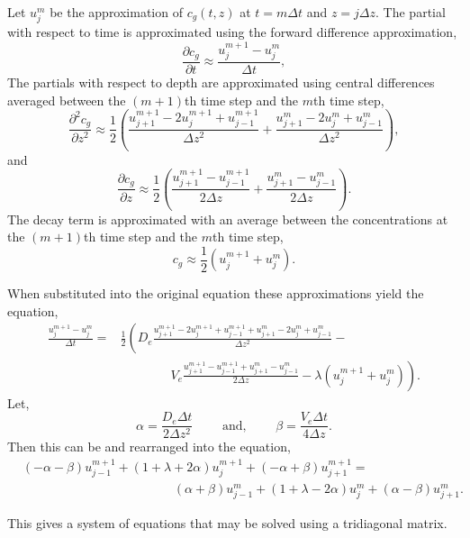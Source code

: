\documentclass[11pt, letterpaper]{article}
\begin{document}
Let $u^m_j$ be the approximation of $c_g(t, z)$ at $t = m \Delta t$ and $z = j \Delta z$.
The partial with respect to time is approximated using the forward difference approximation,
\[
    \frac{\partial c_g}{\partial t} \approx \frac{u^{m + 1}_j - u^m_j}{\Delta t},
\]
The partials with respect to depth are approximated using central differences averaged between the $(m + 1)$th time step and the $m$th time step,
\[
    \frac{\partial^2 c_g}{\partial z^2} \approx \frac{1}{2} \left(
        \frac{u^{m + 1}_{j + 1} - 2u^{m + 1}_j + u^{m + 1}_{j - 1}}{\Delta z^2} +
    \frac{u^{m}_{j + 1} - 2u^{m}_j + u^{m}_{j - 1}}{\Delta z^2} \right),
\]
and
\[
    \frac{\partial c_g}{\partial z} \approx \frac{1}{2} \left(
        \frac{u^{m + 1}_{j + 1} - u^{m + 1}_{j - 1}}{2\Delta z} +
    \frac{u^{m}_{j + 1} - u^{m}_{j - 1}}{2\Delta z} \right).
\]
The decay term is approximated with an average between the concentrations at the $(m + 1)$th time step and the $m$th time step,
\[
    c_g \approx \frac{1}{2} \left( u^{m+1}_{j} + u^m_j \right).
\]

When substituted into the original equation these approximations yield the equation,
\[
    \begin{split}
        \frac{u^{m + 1}_j - u^m_j}{\Delta t} = &\frac{1}{2} \left(
            D_e\frac{u^{m + 1}_{j + 1} - 2u^{m + 1}_j + u^{m + 1}_{j - 1} + u^{m}_{j + 1} - 2u^{m}_j + u^{m}_{j - 1}}{\Delta z^2} - \right. \\
            &\qquad\qquad \left. V_e\frac{u^{m + 1}_{j + 1} - u^{m + 1}_{j - 1} + u^{m}_{j + 1} - u^{m}_{j - 1}}{2\Delta z} - \lambda(u^{m + 1}_j + u^m_j) \right).
    \end{split}
\]
Let,
\[
    \alpha = \frac{D_e\Delta t}{2\Delta z^2} \qquad \text{ and, } \qquad \beta = \frac{V_e\Delta t}{4\Delta z} .
\]
Then this can be and rearranged into the equation,
\begin{equation}
    \label{eq:cn_iterative_solution}
    \begin{split}
        &(-\alpha - \beta)u^{m + 1}_{j -1} + \left(1 + \lambda + 2\alpha \right)u^{m + 1}_j + (-\alpha + \beta) u^{m + 1}_{j + 1} = \\
        &\qquad\qquad\qquad\qquad\qquad\qquad (\alpha + \beta)u^{m}_{j -1} + \left(1 + \lambda - 2\alpha \right)u^{m}_j + (\alpha - \beta) u^{m}_{j + 1}.
    \end{split}
\end{equation}

This gives a system of equations that may be solved using a tridiagonal matrix.
\end{document}
